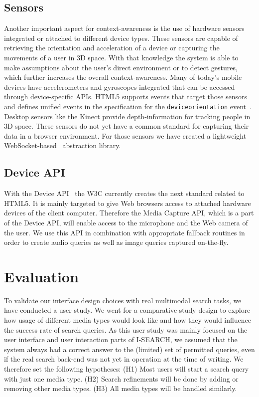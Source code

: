 \documentclass[runningheads,a4paper]{llncs} \usepackage[utf8]{inputenc}
\begin{document}
\subsection{Sensors}
Another important aspect for context-awareness is the use of hardware sensors integrated or attached to different device types. These sensors are capable of retrieving the orientation and acceleration of a device or capturing the movements of a user in 3D space. With that knowledge the system is able to make assumptions about the user's
direct environment or to detect gestures, which further increases the overall context-awareness. Many of today's mobile devices have accelerometers and gyroscopes integrated that can be accessed through device-specific APIs. HTML5 supports events that target those sensors and defines unified events in the specification for the \texttt{deviceorientation} event~\cite{deviceOrientation}. Desktop sensors like the Kinect provide depth-information for tracking people in 3D space. These sensors do not yet have a common standard for capturing their data in a browser environment. For those sensors we have created a lightweight WebSocket-based~\cite{websockets} abstraction library.

\subsection{Device API}
With the Device API~\cite{deviceAPI} the W3C currently creates the next standard related to HTML5. It is mainly targeted to give Web browsers access to attached hardware devices of the client computer. Therefore the Media Capture API, which is a part of the Device API, will enable access to the microphone and the Web camera of the user. We use this API in combination with appropriate fallback routines in order to create audio queries as well as image queries captured on-the-fly.

\section{Evaluation}
To validate our interface design choices with real multimodal search tasks, we have conducted a user study. We went for a comparative study design to explore how usage of different media types would look like and how they would influence the success rate of search queries. As this user study was mainly focused on the user interface and user interaction parts of \mbox{I-SEARCH}, we assumed that the system always had a correct answer to the (limited) set of permitted queries, even if the real search back-end was not yet in operation at the time of writing. We therefore set the following hypotheses: (H1) Most users will start a search query with just one media type. (H2) Search refinements will be done by adding or removing other media types. (H3) All media types will be handled similarly.
\end{document}
